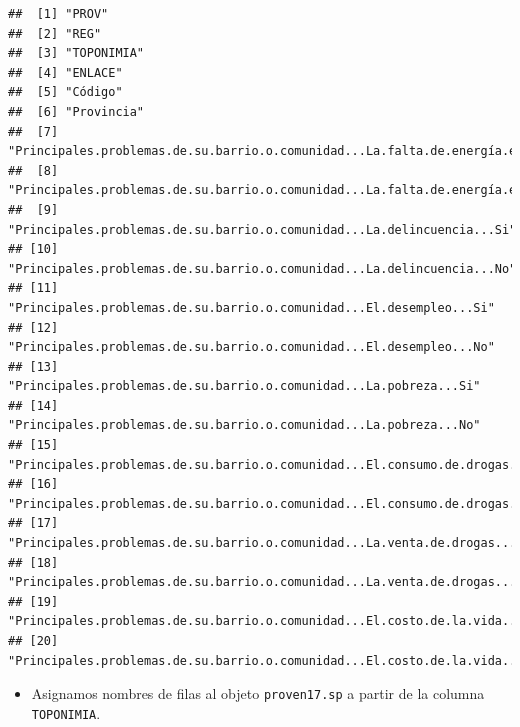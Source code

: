\documentclass[11pt,]{article}
\newenvironment{Shaded}{\begin{snugshade}}{\end{snugshade}}
\newcommand{\KeywordTok}[1]{\textcolor[rgb]{0.13,0.29,0.53}{\textbf{#1}}}
\newcommand{\StringTok}[1]{\textcolor[rgb]{0.31,0.60,0.02}{#1}}
\newcommand{\OperatorTok}[1]{\textcolor[rgb]{0.81,0.36,0.00}{\textbf{#1}}}
\newcommand{\NormalTok}[1]{#1}
\providecommand{\tightlist}{%
\setlength{\itemsep}{0pt}\setlength{\parskip}{0pt}}
\begin{document}
\begin{verbatim}
##  [1] "PROV"                                                                               
##  [2] "REG"                                                                                
##  [3] "TOPONIMIA"                                                                          
##  [4] "ENLACE"                                                                             
##  [5] "Código"                                                                             
##  [6] "Provincia"                                                                          
##  [7] "Principales.problemas.de.su.barrio.o.comunidad...La.falta.de.energía.eléctrica...Si"
##  [8] "Principales.problemas.de.su.barrio.o.comunidad...La.falta.de.energía.eléctrica...No"
##  [9] "Principales.problemas.de.su.barrio.o.comunidad...La.delincuencia...Si"              
## [10] "Principales.problemas.de.su.barrio.o.comunidad...La.delincuencia...No"              
## [11] "Principales.problemas.de.su.barrio.o.comunidad...El.desempleo...Si"                 
## [12] "Principales.problemas.de.su.barrio.o.comunidad...El.desempleo...No"                 
## [13] "Principales.problemas.de.su.barrio.o.comunidad...La.pobreza...Si"                   
## [14] "Principales.problemas.de.su.barrio.o.comunidad...La.pobreza...No"                   
## [15] "Principales.problemas.de.su.barrio.o.comunidad...El.consumo.de.drogas...Si"         
## [16] "Principales.problemas.de.su.barrio.o.comunidad...El.consumo.de.drogas...No"         
## [17] "Principales.problemas.de.su.barrio.o.comunidad...La.venta.de.drogas...Si"           
## [18] "Principales.problemas.de.su.barrio.o.comunidad...La.venta.de.drogas...No"           
## [19] "Principales.problemas.de.su.barrio.o.comunidad...El.costo.de.la.vida...Si"          
## [20] "Principales.problemas.de.su.barrio.o.comunidad...El.costo.de.la.vida...No"
\end{verbatim}

\begin{Shaded}
\end{Shaded}

\begin{itemize}
\tightlist
\item
  Asignamos nombres de filas al objeto \texttt{proven17.sp} a partir de
  la columna \texttt{TOPONIMIA}.
\end{itemize}
\end{document}
